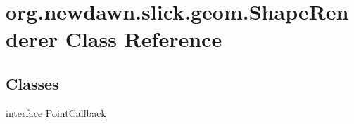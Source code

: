 \hypertarget{classorg_1_1newdawn_1_1slick_1_1geom_1_1_shape_renderer}{}\section{org.\+newdawn.\+slick.\+geom.\+Shape\+Renderer Class Reference}
\label{classorg_1_1newdawn_1_1slick_1_1geom_1_1_shape_renderer}
\subsection*{Classes}
\begin{DoxyCompactItemize}
\item 
interface \mbox{\hyperlink{interfaceorg_1_1newdawn_1_1slick_1_1geom_1_1_shape_renderer_1_1_point_callback}{Point\+Callback}}
\end{DoxyCompactItemize}
